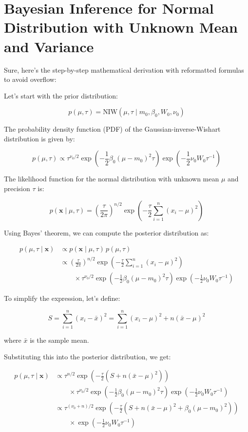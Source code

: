 \documentclass[11pt]{article}
\begin{document}
    \section[]{Bayesian Inference for Normal Distribution with Unknown Mean and Variance}
    Sure, here's the step-by-step mathematical derivation with reformatted formulas to avoid overflow:

    Let's start with the prior distribution:

    $$p(\mu, \tau) = \text{NIW}(\mu, \tau \mid m_0, \beta_0, W_0, \nu_0)$$

    The probability density function (PDF) of the Gaussian-inverse-Wishart distribution is given by:

    $$p(\mu, \tau) \propto \tau^{\nu_0/2} \exp\left(-\frac{1}{2} \beta_0 (\mu - m_0)^2 \tau\right) \exp\left(-\frac{1}{2} \nu_0 W_0 \tau^{-1}\right)$$

    The likelihood function for the normal distribution with unknown mean $\mu$ and precision $\tau$ is:

    $$p(\mathbf{x} \mid \mu, \tau) = \left(\frac{\tau}{2\pi}\right)^{n/2} \exp\left(-\frac{\tau}{2} \sum_{i=1}^n (x_i - \mu)^2\right)$$

    Using Bayes' theorem, we can compute the posterior distribution as:

    \begin{align*}
        p(\mu, \tau \mid \mathbf{x}) &\propto p(\mathbf{x} \mid \mu, \tau) \, p(\mu, \tau) \\
        &\propto \left(\frac{\tau}{2\pi}\right)^{n/2} \exp\left(-\frac{\tau}{2} \sum_{i=1}^n (x_i - \mu)^2\right) \\
        &\quad\quad \times \tau^{\nu_0/2} \exp\left(-\frac{1}{2} \beta_0 (\mu - m_0)^2 \tau\right) \exp\left(-\frac{1}{2} \nu_0 W_0 \tau^{-1}\right)
    \end{align*}

    To simplify the expression, let's define:

    $$S = \sum_{i=1}^n (x_i - \bar{x})^2 = \sum_{i=1}^n (x_i - \mu)^2 + n (\bar{x} - \mu)^2$$

    where $\bar{x}$ is the sample mean.

    Substituting this into the posterior distribution, we get:

    \begin{align*}
        p(\mu, \tau \mid \mathbf{x}) &\propto \tau^{n/2} \exp\left(-\frac{\tau}{2} \left(S + n (\bar{x} - \mu)^2\right)\right) \\
        &\quad\quad \times \tau^{\nu_0/2} \exp\left(-\frac{1}{2} \beta_0 (\mu - m_0)^2 \tau\right) \exp\left(-\frac{1}{2} \nu_0 W_0 \tau^{-1}\right) \\
        &\propto \tau^{(\nu_0 + n)/2} \exp\left(-\frac{\tau}{2} \left(S + n (\bar{x} - \mu)^2 + \beta_0 (\mu - m_0)^2\right)\right) \\
        &\quad\quad \times \exp\left(-\frac{1}{2} \nu_0 W_0 \tau^{-1}\right)
    \end{align*}
\end{document}
